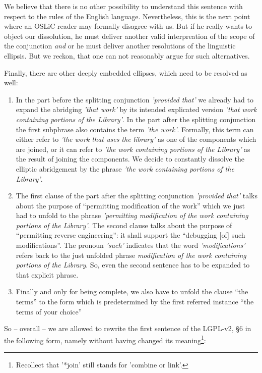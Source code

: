 We believe that there is no other possibility to understand this sentence with
respect to the rules of the English language. Nevertheless, this is the next
point where an OSLiC reader may formally disagree with us. But if he really
wants to object our dissolution, he must deliver another valid interpreation of
the scope of the conjunction \emph{and} or he must deliver another resolutions
of the linguistic ellipsis. But we reckon, that one can not reasonably argue for
such alternatives.

Finally, there are other deeply embedded ellipses, which need to be resolved
as well:

\begin{enumerate}
  \item  In the part before the splitting conjunction \emph{'provided that'} we
  already had to expand the abridging \emph{'that work'} by its intended
  explicated version \emph{'that work containing portions of the Library'}.  In
  the part after the splitting conjunction the first subphrase also contains the
  term \emph{'the work'}. Formally, this term can either refer to \emph{'the
  work that uses the library'} as one of the components which are joined, or it
  can refer to \emph{'the work containing portions of the Library'} as the
  result of joining the components. We decide to constantly dissolve the
  elliptic abridgement by the phrase \emph{'the work containing portions of the
  Library'}.
  \item The first clause of the part after the splitting conjunction
  \emph{'provided that'} talks about the purpose of \enquote{permitting
  modification of the work} which we just had to unfold to the phrase
  \emph{'permitting modification of the work containing portions of the
  Library'}. The second clause talks about the purpose of \enquote{permitting
  reverse engineering}: it shall support the \enquote{debugging [of] such
  modifications}. The pronoun \emph{'such'} indicates that the word
  \emph{'modifications'} refers back to the just unfolded phrase
  \emph{modification of the work containing portions of the Library}. So, even
  the second sentence has to be expanded to that explicit phrase.
  \item Finally and only for being complete, we also have to unfold the clause
  \enquote{the terms} to the form which is predetermined by the first referred
  instance \enquote{the terms of your choice}
\end{enumerate}

So -- overall -- we are allowed to rewrite the first sentence of the LGPL-v2, §6
in the following form, namely without having changed its
meaning\footnote{Recollect that '*join' still stands for 'combine or link'.}:

